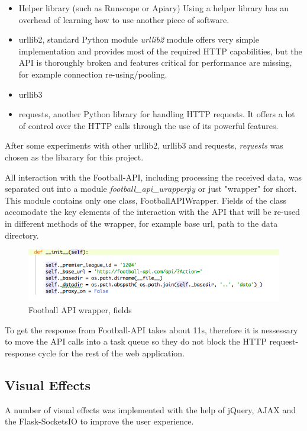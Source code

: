 \begin{itemize}
	\item Helper library (such as Runscope or Apiary)
	Using a helper library has an overhead of learning how to use another piece of software.
	\item urllib2, standard Python module
	\emph{urllib2} module offers very simple implementation and provides most of the required HTTP capabilities, but the API is thoroughly broken and features critical for performance are missing, for example connection re-using/pooling. 
	\item urllib3
	\item requests, another Python library for handling HTTP requests. It offers a lot of control over the HTTP calls through the use of its powerful features.
\end{itemize}
		
After some experiments with other urllib2, urllib3 and requests, \emph{requests} was chosen as the libarary for this project.
		
All interaction with the Football-API, including processing the received data, was separated out into a module \emph{football\_api\_wrapper\.py} or just "wrapper" for short. This module contains only one class, FootballAPIWrapper. Fields of the class accomodate the key elements of the interaction with the API that will be re-used in different methods of the wrapper, for example base url, path to the data directory.
	
\begin{figure}[H]
	\begin{center}
		\includegraphics[width=.90\linewidth,natwidth=610,natheight=642]{impl/images/footballApiWrapperFields}
		\caption{Football API wrapper, fields} \label{fig:using:footballapiwrapperfields}
	\end{center}
\end{figure}
	
To get the response from Football-API takes about 11s, therefore it is nessessary to move the API calls into a task queue so they do not block the HTTP request-response cycle for the rest of the web application.

\subsection{Visual Effects}
A number of visual effects was implemented with the help of jQuery, AJAX and the Flask-SocketsIO to improve the user experience. 

